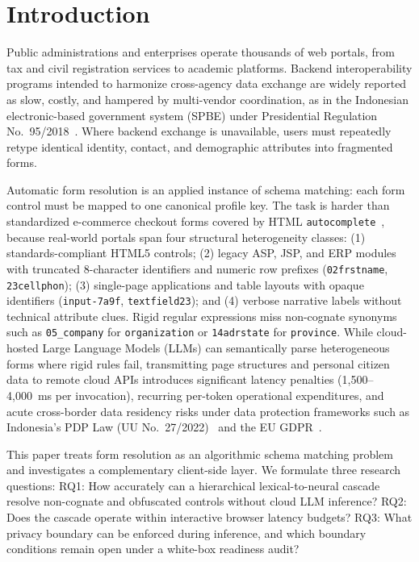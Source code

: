 \documentclass[11pt,runningheads,a4paper]{llncs}
\begin{document}
\section{Introduction}
Public administrations and enterprises operate thousands of web portals, from tax and civil registration services to academic platforms. Backend interoperability programs intended to harmonize cross-agency data exchange are widely reported as slow, costly, and hampered by multi-vendor coordination, as in the Indonesian electronic-based government system (SPBE) under Presidential Regulation No.~95/2018~\cite{spbe,perpres}. Where backend exchange is unavailable, users must repeatedly retype identical identity, contact, and demographic attributes into fragmented forms.

Automatic form resolution is an applied instance of schema matching: each form control must be mapped to one canonical profile key. The task is harder than standardized e-commerce checkout forms covered by HTML \texttt{autocomplete}~\cite{whatwg}, because real-world portals span four structural heterogeneity classes: (1) standards-compliant HTML5 controls; (2) legacy ASP, JSP, and ERP modules with truncated 8-character identifiers and numeric row prefixes (\texttt{02frstname}, \texttt{23cellphon}); (3) single-page applications and table layouts with opaque identifiers (\texttt{input-7a9f}, \texttt{textfield23}); and (4) verbose narrative labels without technical attribute clues. Rigid regular expressions miss non-cognate synonyms such as \texttt{05\_company} for \texttt{organization} or \texttt{14adrstate} for \texttt{province}. While cloud-hosted Large Language Models (LLMs) can semantically parse heterogeneous forms where rigid rules fail, transmitting page structures and personal citizen data to remote cloud APIs introduces significant latency penalties (1,500--4,000~ms per invocation), recurring per-token operational expenditures, and acute cross-border data residency risks under data protection frameworks such as Indonesia's PDP Law (UU No.~27/2022)~\cite{uupdp} and the EU GDPR~\cite{gdpr}.

This paper treats form resolution as an algorithmic schema matching problem and investigates a complementary client-side layer. We formulate three research questions:
RQ1: How accurately can a hierarchical lexical-to-neural cascade resolve non-cognate and obfuscated controls without cloud LLM inference?
RQ2: Does the cascade operate within interactive browser latency budgets?
RQ3: What privacy boundary can be enforced during inference, and which boundary conditions remain open under a white-box readiness audit?
\end{document}

